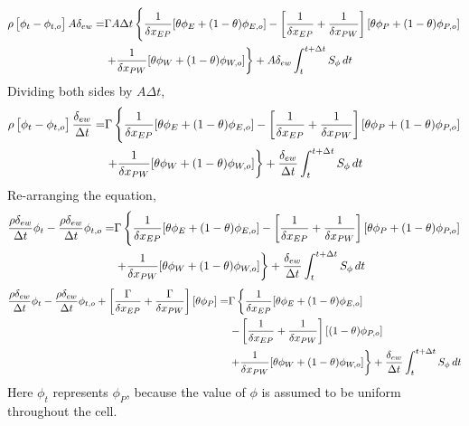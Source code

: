 \documentclass[class=report, 12pt, crop=false]{standalone}
\begin{document}
\begin{center}
\begin{equation*}
\begin{split}
\rho \left[\phi_{t} - \phi_{t,o}\right]A\delta_{ew} = & \Gamma A\Delta t\left\{\frac{1}{\delta x_{EP}}[\theta\phi_{E} + (1-\theta)\phi_{E,o}]  - \left[\frac{1}{\delta x_{EP}} + \frac{1}{\delta x_{PW}}\right][\theta\phi_{P} + (1-\theta)\phi_{P,o}]  \right.\\ & \left. + \frac{1}{\delta x_{PW}}[\theta\phi_{W} + (1-\theta)\phi_{W,o}]\right\} + A\delta_{ew}\int^{t+\Delta t}_{t} S_\phi\,dt
\end{split}
\end{equation*}
Dividing both sides by $A\Delta t$,
\begin{equation*}
\begin{split}
\rho \left[\phi_{t} - \phi_{t,o}\right]\frac{\delta_{ew}}{\Delta t} = & \Gamma \left\{\frac{1}{\delta x_{EP}}[\theta\phi_{E} + (1-\theta)\phi_{E,o}]  - \left[\frac{1}{\delta x_{EP}} + \frac{1}{\delta x_{PW}}\right][\theta\phi_{P} + (1-\theta)\phi_{P,o}]  \right.\\ & \left. + \frac{1}{\delta x_{PW}}[\theta\phi_{W} + (1-\theta)\phi_{W,o}]\right\} + \frac{\delta_{ew}}{\Delta t}\int^{t+\Delta t}_{t} S_\phi\,dt
\end{split}
\end{equation*}
Re-arranging the equation,
\begin{equation*}
\begin{split}
\frac{\rho\delta_{ew}}{\Delta t}\phi_{t} - \frac{\rho\delta_{ew}}{\Delta t}\phi_{t,o} = & \Gamma \left\{\frac{1}{\delta x_{EP}}[\theta\phi_{E} + (1-\theta)\phi_{E,o}] - \left[\frac{1}{\delta x_{EP}} + \frac{1}{\delta x_{PW}}\right][\theta\phi_{P} + (1-\theta)\phi_{P,o}]  \right.\\ & \left.  + \frac{1}{\delta x_{PW}}[\theta\phi_{W} + (1-\theta)\phi_{W,o}]\right\} + \frac{\delta_{ew}}{\Delta t}\int^{t+\Delta t}_{t} S_\phi\,dt
\end{split}
\end{equation*}
\begin{equation*}
\begin{split}
\frac{\rho\delta_{ew}}{\Delta t}\phi_{t} - \frac{\rho\delta_{ew}}{\Delta t}\phi_{t,o} + \left[\frac{\Gamma}{\delta x_{EP}} + \frac{\Gamma}{\delta x_{PW}}\right][\theta\phi_{P}] = & \Gamma \left\{\frac{1}{\delta x_{EP}}[\theta\phi_{E} + (1-\theta)\phi_{E,o}]  \right.\\ & \left. - \left[\frac{1}{\delta x_{EP}} + \frac{1}{\delta x_{PW}}\right][(1-\theta)\phi_{P,o}]  \right.\\ & \left. + \frac{1}{\delta x_{PW}}[\theta\phi_{W} + (1-\theta)\phi_{W,o}]\right\} + \frac{\delta_{ew}}{\Delta t}\int^{t+\Delta t}_{t} S_\phi\,dt
\end{split}
\end{equation*}
Here $\phi_{t}$ represents $\phi_{P}$, because the value of $\phi$ is assumed to be uniform throughout the cell.

\end{center}
\end{document}

